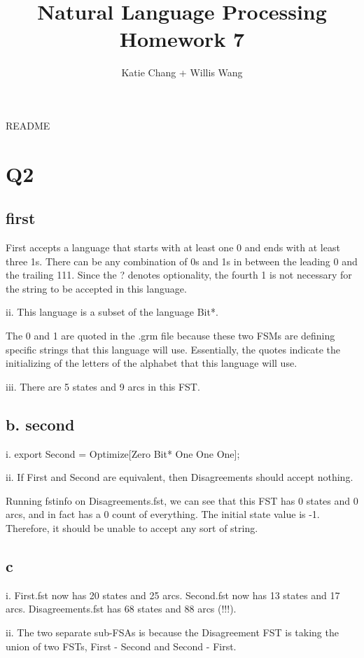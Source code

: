 \documentclass[12pt, letterpaper]{article}
\title{Natural Language Processing Homework 7}
\author{Katie Chang + Willis Wang}
\begin{document}
\maketitle

README

\section{Q2}

\subsection{first}

First accepts a language that starts with at least one 0 and ends with at least three 1s. There can be any combination of 0s and 1s in between the leading 0 and the trailing 111. Since the ? denotes optionality, the fourth 1 is not necessary for the string to be accepted in this language. 

ii. This language is a subset of the language Bit*.

The 0 and 1 are quoted in the .grm file because these two FSMs are defining specific strings that this language will use. Essentially, the quotes indicate the initializing of the  letters of the alphabet that this language will use.

iii. There are 5 states and 9 arcs in this FST.

\subsection{b. second}

i. export Second = Optimize[Zero Bit* One One One];

ii. If First and Second are equivalent, then Disagreements should accept nothing.

Running fstinfo on Disagreements.fst, we can see that this FST has 0 states and 0 arcs, and in fact has a 0 count of everything. The initial state value is -1. Therefore, it should be unable to accept any sort of string. 

\subsection{c}

i. First.fst now has 20 states and 25 arcs. Second.fst now has 13 states and 17 arcs. Disagreements.fst has 68 states and 88 arcs (!!!). 

ii. The two separate sub-FSAs is because the Disagreement FST is taking the union of two FSTs, First - Second and Second - First.
\end{document}
